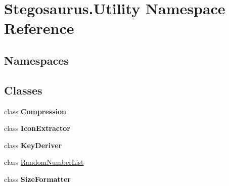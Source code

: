 \hypertarget{namespace_stegosaurus_1_1_utility}{}\section{Stegosaurus.\+Utility Namespace Reference}
\label{namespace_stegosaurus_1_1_utility}
\subsection*{Namespaces}
\begin{DoxyCompactItemize}
\end{DoxyCompactItemize}
\subsection*{Classes}
\begin{DoxyCompactItemize}
\item 
class {\bfseries Compression}
\item 
class {\bfseries Icon\+Extractor}
\item 
class {\bfseries Key\+Deriver}
\item 
class \hyperlink{class_stegosaurus_1_1_utility_1_1_random_number_list}{Random\+Number\+List}
\item 
class {\bfseries Size\+Formatter}
\end{DoxyCompactItemize}
